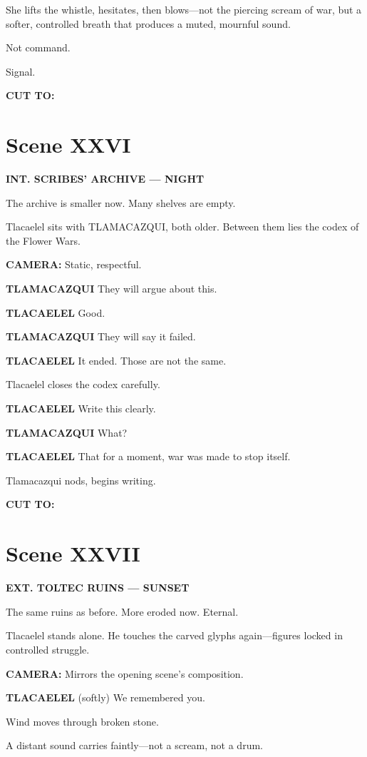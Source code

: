 \documentclass[12pt]{article}
\begin{document}
She lifts the whistle, hesitates, then blows—not the piercing scream of war, but a softer, controlled breath that produces a muted, mournful sound.

Not command.

Signal.

\textbf{CUT TO:}

\section*{Scene XXVI}

\textbf{INT. SCRIBES’ ARCHIVE — NIGHT}

The archive is smaller now. Many shelves are empty.

Tlacaelel sits with TLAMACAZQUI, both older. Between them lies the codex of the Flower Wars.

\textbf{CAMERA:} Static, respectful.

\textbf{TLAMACAZQUI}  
They will argue about this.

\textbf{TLACAELEL}  
Good.

\textbf{TLAMACAZQUI}  
They will say it failed.

\textbf{TLACAELEL}  
It ended.  
Those are not the same.

Tlacaelel closes the codex carefully.

\textbf{TLACAELEL}  
Write this clearly.

\textbf{TLAMACAZQUI}  
What?

\textbf{TLACAELEL}  
That for a moment,  
war was made to stop itself.

Tlamacazqui nods, begins writing.

\textbf{CUT TO:}

\section*{Scene XXVII}

\textbf{EXT. TOLTEC RUINS — SUNSET}

The same ruins as before. More eroded now. Eternal.

Tlacaelel stands alone. He touches the carved glyphs again—figures locked in controlled struggle.

\textbf{CAMERA:} Mirrors the opening scene’s composition.

\textbf{TLACAELEL}  
(softly)  
We remembered you.

Wind moves through broken stone.

A distant sound carries faintly—not a scream, not a drum.
\end{document}
